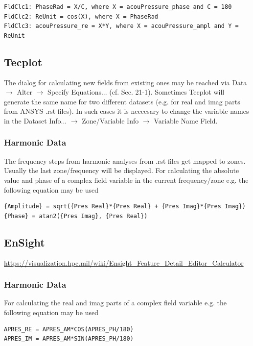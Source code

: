 \begin{verbatim}
FldClc1: PhaseRad = X/C, where X = acouPressure_phase and C = 180
FldClc2: ReUnit = cos(X), where X = PhaseRad
FldClc3: acouPressure_re = X*Y, where X = acouPressure_ampl and Y = ReUnit 
\end{verbatim}

\subsection{Tecplot}

The dialog  for calculating new fields  from existing ones may  be reached via
Data     $\rightarrow$     Alter     $\rightarrow$    Specify     Equations...
(cf. \cite{TPUM2011} Sec. 21-1). Sometimes Tecplot will generate the same name
for two  different datasets  (e.g.  for  real and imag  parts from  ANSYS .rst
files).  In  such cases it  is neccesary to  change the variable names  in the
Dataset Info...  $\rightarrow$  Zone/Variable Info $\rightarrow$ Variable Name
Field.  

\subsubsection{Harmonic Data} The frequency  steps from harmonic analyses from
.rst  files get  mapped to  zones.  Usually  the last  zone/frequency  will be
displayed. For  calculating the  absolute value and  phase of a  complex field
variable in the current frequency/zone e.g. the following equation may be used

\begin{verbatim}
{Amplitude} = sqrt({Pres Real}*{Pres Real} + {Pres Imag}*{Pres Imag})
{Phase} = atan2({Pres Imag}, {Pres Real})
\end{verbatim}

\subsection{EnSight}

\url{https://visualization.hpc.mil/wiki/Ensight_Feature_Detail_Editor_Calculator}

\subsubsection{Harmonic Data}  For calculating  the real and  imag parts  of a
complex field variable e.g. the following equation may be used

\begin{verbatim}
APRES_RE = APRES_AM*COS(APRES_PH/180)
APRES_IM = APRES_AM*SIN(APRES_PH/180)
\end{verbatim}


